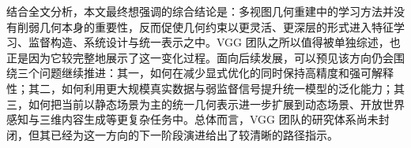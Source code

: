 结合全文分析，本文最终想强调的综合结论是：多视图几何重建中的学习方法并没有削弱几何本身的重要性，反而促使几何约束以更灵活、更深层的形式进入特征学习、监督构造、系统设计与统一表示之中。VGG 团队之所以值得被单独综述，也正是因为它较完整地展示了这一变化过程。面向后续发展，可以预见该方向仍会围绕三个问题继续推进：其一，如何在减少显式优化的同时保持高精度和强可解释性；其二，如何利用更大规模真实数据与弱监督信号提升统一模型的泛化能力；其三，如何把当前以静态场景为主的统一几何表示进一步扩展到动态场景、开放世界感知与三维内容生成等更复杂任务中。总体而言，VGG 团队的研究体系尚未封闭，但其已经为这一方向的下一阶段演进给出了较清晰的路径指示。
